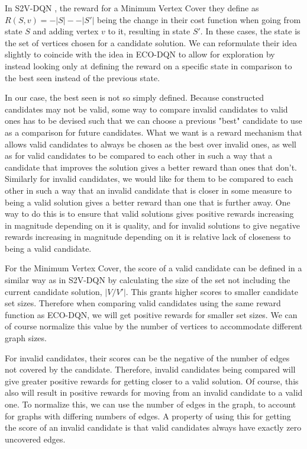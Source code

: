 \documentclass{article}
\begin{document}
In S2V-DQN \cite{s2v-dqn}, the reward for a Minimum Vertex Cover they define as $R(S, v) = -|S| - -|S'|$ being the change in their cost function when going from state $S$ and adding vertex $v$ to it, resulting in state $S'$. In these cases, the state is the set of vertices chosen for a candidate solution. We can reformulate their idea slightly to coincide with the idea in ECO-DQN to allow for exploration by instead looking only at defining the reward on a specific state in comparison to the best seen instead of the previous state.

In our case, the best seen is not so simply defined. Because constructed candidates may not be valid, some way to compare invalid candidates to valid ones has to be devised such that we can choose a previous "best" candidate to use as a comparison for future candidates. What we want is a reward mechanism that allows valid candidates to always be chosen as the best over invalid ones, as well as for valid candidates to be compared to each other in such a way that a candidate that improves the solution gives a better reward than ones that don't. Similarly for invalid candidates, we would like for them to be compared to each other in such a way that an invalid candidate that is closer in some measure to being a valid solution gives a better reward than one that is further away. One way to do this is to ensure that valid solutions gives positive rewards increasing in magnitude depending on it is quality, and for invalid solutions to give negative rewards increasing in magnitude depending on it is relative lack of closeness to being a valid candidate.

For the Minimum Vertex Cover, the score of a valid candidate can be defined in a similar way as in S2V-DQN by calculating the size of the set not including the current candidate solution, $|V / V'|$. This grants higher scores to smaller candidate set sizes. Therefore when comparing valid candidates using the same reward function as ECO-DQN, we will get positive rewards for smaller set sizes. We can of course normalize this value by the number of vertices to accommodate different graph sizes.

For invalid candidates, their scores can be the negative of the number of edges not covered by the candidate. Therefore, invalid candidates being compared will give greater positive rewards for getting closer to a valid solution. Of course, this also will result in positive rewards for moving from an invalid candidate to a valid one. To normalize this, we can use the number of edges in the graph, to account for graphs with differing numbers of edges. A property of using this for getting the score of an invalid candidate is that valid candidates always have exactly zero uncovered edges.
\end{document}
